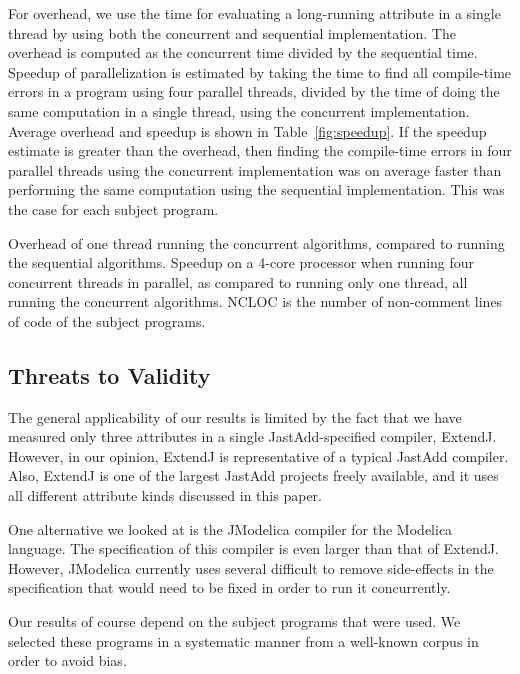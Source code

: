 {For overhead, we use the time for evaluating a long-running attribute in a single
thread by using both the concurrent and sequential implementation.  The overhead is
computed as the concurrent time divided by the sequential time.
Speedup of parallelization is estimated by taking the time to find all compile-time errors
in a program using four parallel threads, divided by the time of doing the same computation
in a single thread, using the concurrent implementation.
Average overhead and speedup is shown in Table~\ref{fig:speedup}.
If the speedup estimate is greater than the overhead, then finding the compile-time errors
in four parallel threads
using the concurrent implementation was on average faster than performing the same computation
using the sequential implementation.
This was the case for each subject program.

\begin{table}[h]
\centering

\caption{
Overhead of one thread running the concurrent algorithms, compared to running the sequential algorithms. Speedup on a 4-core processor when running four concurrent threads in parallel, as compared to running only one thread, all running the concurrent algorithms. NCLOC is
the number of non-comment lines of code of the subject programs.}
\label{fig:speedup}
\end{table}


\subsection{Threats to Validity}
\label{threats-to-validity}

The general applicability of our results is limited by the fact that we
have measured only three attributes in
a single JastAdd-specified compiler, ExtendJ.  However, in our opinion,
ExtendJ is representative of a typical JastAdd compiler.
Also, ExtendJ is one of the largest JastAdd projects freely available,
and it uses all different attribute kinds discussed in this paper.

One alternative we looked at is the JModelica compiler for the
Modelica language. The specification of this compiler is even larger than that
of ExtendJ. However, JModelica currently uses
several difficult to remove
side-effects in the specification that would need to be fixed
in order to run it concurrently.

Our results of course depend on the subject programs that were used.
We selected these programs in a systematic
manner from a well-known corpus in order to avoid bias.


}
